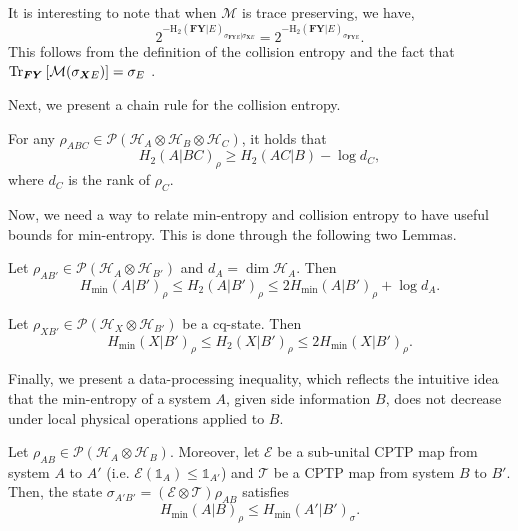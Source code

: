 It is interesting to note that when $\mathcal{M}$ is trace preserving, we have,
$$2^{-\text{H}_2(\mathbf{F}\mathbf{Y} | E)_{\sigma_{\mathbf{F}\mathbf{Y}E} | \sigma_{\mathbf{X}E}}} = 2^{-\text{H}_2(\mathbf{F}\mathbf{Y} | E)_{\sigma_{\mathbf{F}\mathbf{Y}E}}}.$$
This follows from the definition of the collision entropy and the fact that $\Tr_{\bm{F} \bm{Y}}\left[ \mathcal{M}(\sigma_{\bm{X} E}) \right] = \sigma_{E}$ \citep{Dupuis2015}. 



Next, we present a chain rule for the collision entropy.

\begin{lemma}
For any $\rho_{ABC}\in\mathcal{P}(\mathcal{H}_A\otimes\mathcal{H}_B\otimes\mathcal{H}_C)$, it holds that
$$H_2(A|BC)_{\rho} \geq H_2(AC|B) - \log d_C,$$
where $d_C$ is the rank of $\rho_C$.
\label{lemma:chain_rule}
\end{lemma}

Now, we need a way to relate min-entropy and collision entropy to have useful bounds for min-entropy. This is done through the following two Lemmas.

\begin{lemma}
\label{lemma:quantumrelation}
Let $\rho_{A B'}\in\mathcal{P}(\mathcal{H}_A \otimes \mathcal{H}_{B'})$ and $d_A = \dim\mathcal{H}_A$. Then
$$H_{\min}(A|B')_{\rho} \leq H_2(A|B')_{\rho} \leq 2 H_{\min}(A|B')_{\rho} + \log d_A.$$
\end{lemma}

\begin{lemma}
\label{lemma:classicalquantumrelation}
Let $\rho_{X B'}\in\mathcal{P}(\mathcal{H}_X \otimes \mathcal{H}_{B'})$ be a cq-state. Then
$$H_{\min}(X|B')_{\rho} \leq H_2(X|B')_{\rho} \leq 2 H_{\min}(X|B')_{\rho}.$$
\end{lemma}

Finally, we present a data-processing inequality, which reflects the intuitive idea that the min-entropy of a system $A$, given side information $B$, does not decrease under local physical operations applied to $B$.

\begin{lemma}
\label{lemma:data_processing_inequality}
Let $\rho_{A B}\in\mathcal{P}(\mathcal{H}_A \otimes \mathcal{H}_{B})$. Moreover, let $\mathcal{E}$ be a sub-unital CPTP map from system $A$ to $A'$ (i.e. $\mathcal{E}(\mathds{1}_A) \leq \mathds{1}_{A'}$) and $\mathcal{T}$ be a CPTP map from system $B$ to $B'$. Then, the state $\sigma_{A' B'} = \left(\mathcal{E}\otimes \mathcal{T}  \right)\rho_{AB}$ satisfies
$$H_{\min}(A|B)_{\rho}\leq H_{\min}(A'|B')_{\sigma}.$$
\end{lemma}

